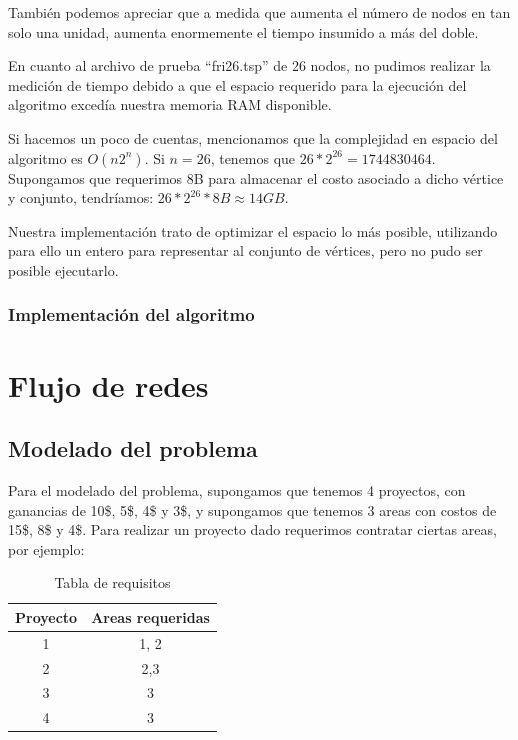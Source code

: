 También podemos apreciar que a medida que aumenta el número de nodos en tan solo una unidad, aumenta enormemente el tiempo insumido a más del doble.

En cuanto al archivo de prueba ``fri26.tsp'' de 26 nodos, no pudimos realizar la medición de tiempo debido a que el espacio requerido para la ejecución del 
algoritmo excedía nuestra memoria RAM disponible.

Si hacemos un poco de cuentas, mencionamos que la complejidad en espacio del algoritmo es $O(n 2^n)$.
Si $n = 26$, tenemos que $26 * 2^{26} = 1744830464$. Supongamos que requerimos 8B para almacenar el costo asociado a dicho vértice y conjunto, tendríamos: $26 * 2^{26} * 8B \approx 14GB$.

Nuestra implementación trato de optimizar el espacio lo más posible, utilizando para ello un entero para representar al conjunto de vértices, pero no pudo ser posible ejecutarlo.
\newpage
\subsubsection{Implementación del algoritmo}







\newpage
\section{Flujo de redes}
\subsection{Modelado del problema}
Para el modelado del problema, supongamos que tenemos 4 proyectos, con ganancias de 10\$, 5\$, 4\$ y 3\$, y supongamos que tenemos 3 areas con costos de 15\$, 8\$ y 4\$.
Para realizar un proyecto dado requerimos contratar ciertas areas, por ejemplo:
\begin{table}[H]
\centering
\begin{tabular}{|c|c|}
\hline
Proyecto & Areas requeridas \\ \hline
1        & 1, 2             \\ \hline
2        & 2,3              \\ \hline
3        & 3                \\ \hline
4        & 3                \\ \hline
\end{tabular}
\caption{Tabla de requisitos}
\end{table}

